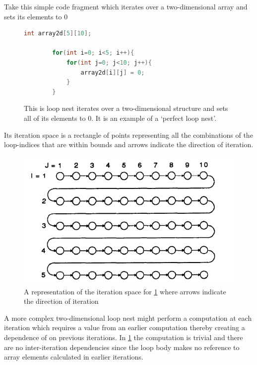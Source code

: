 \documentclass[a4paper,12pt,twoside]{report}
\begin{document}
Take this simple code fragment which iterates over a two-dimensional array and sets its elements to 0
\begin{figure}[h]
    \begin{lstlisting}[language=C]
        int array2d[5][10];

        for(int i=0; i<5; i++){
            for(int j=0; j<10; j++){
                array2d[i][j] = 0;
            }
        }
    \end{lstlisting}
        \caption{
            This is loop nest iterates over a two-dimensional structure and sets all of its elements to 0. It is an example
            of a `perfect loop nest'.
        }
        \label{fig:2dloop}
\end{figure}

Its iteration space is a rectangle of points representing all the combinations of the loop-indices that are within bounds and
arrows indicate the direction of iteration.

\begin{figure}[h]
    \centering
    \includegraphics[scale=0.75]{iteration_space}
    \caption{A representation of the iteration space for \ref{fig:2dloop} where arrows indicate the direction of iteration}
    \label{fig:iteration_space}
\end{figure}

A more complex two-dimensional loop nest might perform a computation at each iteration which requires a value from an earlier
computation thereby creating a dependence of on previous iterations. In \ref{fig:2dloop} the computation is trivial and there are no
inter-iteration dependencies since the loop body makes no reference to array elements calculated in earlier iterations.
\end{document}
